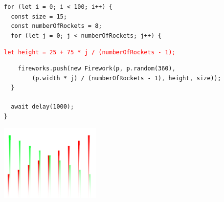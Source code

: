 \documentclass{article}
\begin{document}
    \begin{tcolorbox}[colback=gray!30, colframe=white]
        \begin{verbatim}
for (let i = 0; i < 100; i++) {
  const size = 15;
  const numberOfRockets = 8;
  for (let j = 0; j < numberOfRockets; j++) { \end{verbatim}
        \vspace{-0.4cm}
        \hspace{0.7cm}
        \texttt{\textcolor{red}{let height = 25 + 75 * j / (numberOfRockets - 1);}}\\
        \vspace{-0.4cm}
        \begin{verbatim}
    fireworks.push(new Firework(p, p.random(360),
        (p.width * j) / (numberOfRockets - 1), height, size));
  }

  await delay(1000);
}\end{verbatim}
    \end{tcolorbox}


    \vspace{0.2cm}
    \centering
    \includegraphics[width=5cm]{images/Diagonale2.png}

\end{document}
